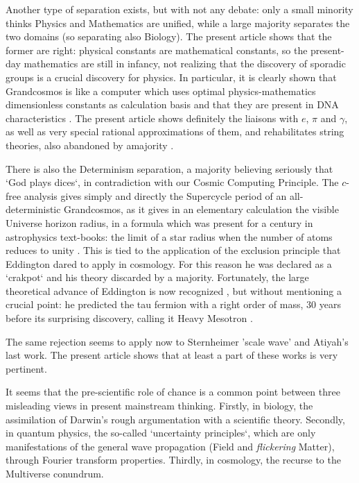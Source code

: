 \documentclass[twoside,draft]{article}
\begin{document}
\begin{sloppypar}
Another type of separation exists, but with not any debate: only a small minority thinks Physics
and Mathematics are unified, while a large majority separates the two domains (so separating also
Biology). The present article shows that the former are right: physical constants are mathematical
constants, so the present-day mathematics are still in infancy, not realizing that the discovery of
sporadic groups is a crucial discovery for physics. In particular, it is clearly shown that
Grandcosmos is like a computer which uses optimal physics-mathematics dimensionless constants as
calculation basis and that they are present in DNA characteristics \cite{Sanchez1}. The present article shows
definitely the liaisons with $e$, $\pi$ and $\gamma$, as well as very special rational approximations of 
them, and rehabilitates string theories, also abandoned by amajority \cite{Woit}.

There is also the Determinism separation, a majority believing seriously that `God plays dices`,
in contradiction with our Cosmic Computing Principle. The $c$-free analysis gives simply and
directly the Supercycle period of an all-deterministic Grandcosmos, as it gives in an elementary
calculation the visible Universe horizon radius, in a formula which was present for a century in
astrophysics text-books: the limit of a star radius when the number of atoms reduces to unity \cite{Sanchez1}.
This is tied to the application of the exclusion principle that Eddington dared to apply in
cosmology. For this reason he was declared as a `crakpot` and his theory discarded by a majority.
Fortunately, the large theoretical advance of Eddington is now recognized \cite{Larin,Durham}, but without
mentioning a crucial point: he predicted the tau fermion with a right order of mass, 30 years before its surprising discovery, calling it Heavy Mesotron \cite{Carr}.

The same rejection seems to apply now to Sternheimer 'scale wave' and Atiyah's last work. The present article shows that at least a part of these works is very pertinent.

It seems that the pre-scientific role of chance is a common point between three misleading views
in present mainstream thinking. Firstly, in biology, the assimilation of Darwin's rough argumentation
with a scientific theory. Secondly, in quantum physics, the so-called `uncertainty principles`, which are
only manifestations of the general wave propagation (Field and \textit{flickering} Matter), through Fourier
transform properties. Thirdly, in cosmology, the recurse to the Multiverse conundrum.


\end{sloppypar}
\end{document}
